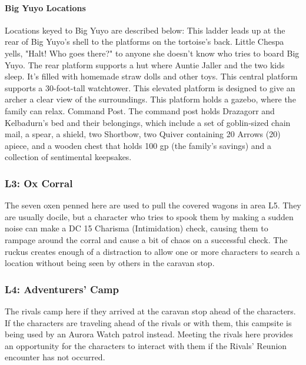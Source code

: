 \documentclass[10pt,a4,twoside,twocolumn,openany,nodeprecatedcode]{dndbook}
\begin{document}
\paragraph{Big Yuyo Locations}
Locations keyed to Big Yuyo are described below:
{{This ladder leads up at the rear of Big Yuyo's shell to the platforms on the tortoise's back. Little Chespa yells, "Halt! Who goes there?" to anyone she doesn't know who tries to board Big Yuyo.}}
{{The rear platform supports a hut where Auntie Jaller and the two kids sleep. It's filled with homemade straw dolls and other toys.}}
{{This central platform supports a 30-foot-tall watchtower.}}
{{This elevated platform is designed to give an archer a clear view of the surroundings.}}
{{This platform holds a gazebo, where the family can relax.}}
{{Command Post. The command post holds Drazagorr and Kelbadurn's bed and their belongings, which include a set of goblin-sized chain mail, a spear, a shield, two Shortbow, two Quiver containing 20 Arrows (20) apiece, and a wooden chest that holds 100 gp (the family's savings) and a collection of sentimental keepsakes.}}
\subsubsection{L3: Ox Corral}
The seven oxen penned here are used to pull the covered wagons in area L5. They are usually docile, but a character who tries to spook them by making a sudden noise can make a DC 15 Charisma (Intimidation) check, causing them to rampage around the corral and cause a bit of chaos on a successful check. The ruckus creates enough of a distraction to allow one or more characters to search a location without being seen by others in the caravan stop.
\subsubsection{L4: Adventurers' Camp}
The rivals camp here if they arrived at the caravan stop ahead of the characters. If the characters are traveling ahead of the rivals or with them, this campsite is being used by an Aurora Watch patrol instead.
Meeting the rivals here provides an opportunity for the characters to interact with them if the Rivals' Reunion encounter has not occurred.
\end{document}
